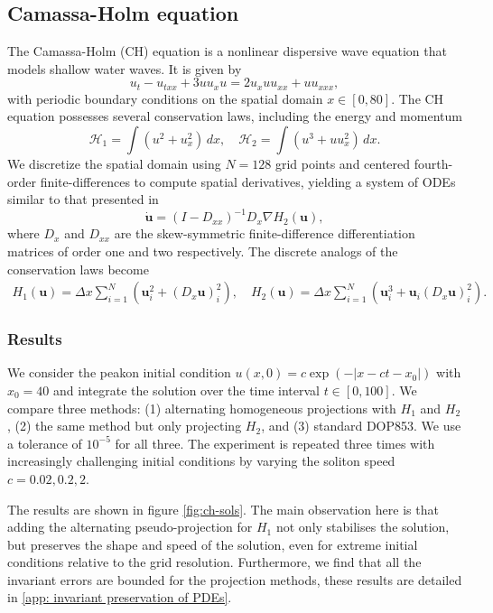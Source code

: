 \documentclass[final,3p,times]{elsarticle}
\begin{document}
\subsection{Camassa-Holm equation}
The Camassa-Holm (CH) equation is a nonlinear dispersive wave equation that models shallow water waves. It is given by
$$u_t - u_{txx}  + 3uu_x u = 2u_x u u_{xx} + u u_{xxx},$$
with periodic boundary conditions on the spatial domain $x\in[0, 80]$. The CH equation possesses several conservation laws, including the energy and momentum
\begin{equation}
\mathcal{H}_1 = \int (u^2 + u_x^2) \,dx ,\quad
\mathcal{H}_2 = \int (u^3 + u u_x^2) \,dx.
\end{equation}
We discretize the spatial domain using $N=128$ grid points and centered fourth-order finite-differences to compute spatial derivatives, yielding a system of ODEs similar to that presented in \cite{eidnes2021linearly}
\begin{equation}
    \dot{\mathbf{u}}= (I-D_{xx})^{-1}D_x\nabla H_2(\mathbf{u}),
\end{equation}
where $D_x$ and $D_{xx}$ are the skew-symmetric finite-difference differentiation matrices of order one and two respectively. The discrete analogs of the conservation laws become
\begin{align}
H_1(\mathbf{u}) = \Delta x \sum_{i=1}^N \left(\mathbf{u}_i^2 + (D_x\mathbf{u})_i^2\right),\quad
H_2(\mathbf{u}) = \Delta x \sum_{i=1}^N \left(\mathbf{u}_i^3 + \mathbf{u}_i (D_x\mathbf{u})_i^2\right).
\end{align} 
\subsubsection{Results}
We consider the peakon initial condition $u(x,0) = c \exp(-|x - ct - x_0|)$ with $x_0=40$ and integrate the solution over the time interval $t\in[0,100]$. We compare three methods: (1) alternating homogeneous projections with $H_1$ and $H_2$, (2) the same method but only projecting $H_2$, and (3) standard DOP853. We use a tolerance of $10^{-5}$ for all three. The experiment is repeated three times with increasingly challenging initial conditions by varying the soliton speed $c=0.02,0.2,2$.

The results are shown in figure \ref{fig:ch-sols}. The main observation here is that adding the alternating pseudo-projection for $H_1$ not only stabilises the solution, but preserves the shape and speed of the solution, even for extreme initial conditions relative to the grid resolution. Furthermore, we find that all the invariant errors are bounded for the projection methods, these results are detailed in \ref{app: invariant preservation of PDEs}. 
\end{document}
